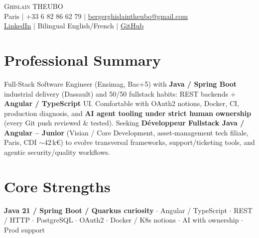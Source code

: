 \documentclass[letterpaper,10.5pt]{article}
\begin{document}
\begin{center}
{\Huge \scshape Ghislain THEUBO} \\ \vspace{2pt}
\small Paris $|$ +33 6 82 86 62 79 $|$ \href{mailto:bergerghislaintheubo@gmail.com}{bergerghislaintheubo@gmail.com} \\
\href{https://www.linkedin.com/in/berger-ghislain}{LinkedIn} $|$ Bilingual English/French $|$ \href{https://github.com/Bergerghislain}{GitHub}
\end{center}
\vspace{-6pt}
\section{Professional Summary}
\small{Full-Stack Software Engineer (Ensimag, Bac+5) with \textbf{Java / Spring Boot} industrial delivery (Dassault) and 50/50 fullstack habits: REST backends + \textbf{Angular / TypeScript} UI. Comfortable with OAuth2 notions, Docker, CI, production diagnosis, and \textbf{AI agent tooling under strict human ownership} (every Git push reviewed \& tested). Seeking \textbf{D\'eveloppeur Fullstack Java / Angular -- Junior} (Visian / Core Development, asset-management tech filiale, Paris, CDI $\sim$42\,k€) to evolve transversal frameworks, support/ticketing tools, and agentic security/quality workflows.}
\section{Core Strengths}
\small{\textbf{Java 21 / Spring Boot / Quarkus curiosity} $\cdot$ Angular / TypeScript $\cdot$ REST / HTTP $\cdot$ PostgreSQL $\cdot$ OAuth2 $\cdot$ Docker / K8s notions $\cdot$ AI with ownership $\cdot$ Prod support}
\end{document}
